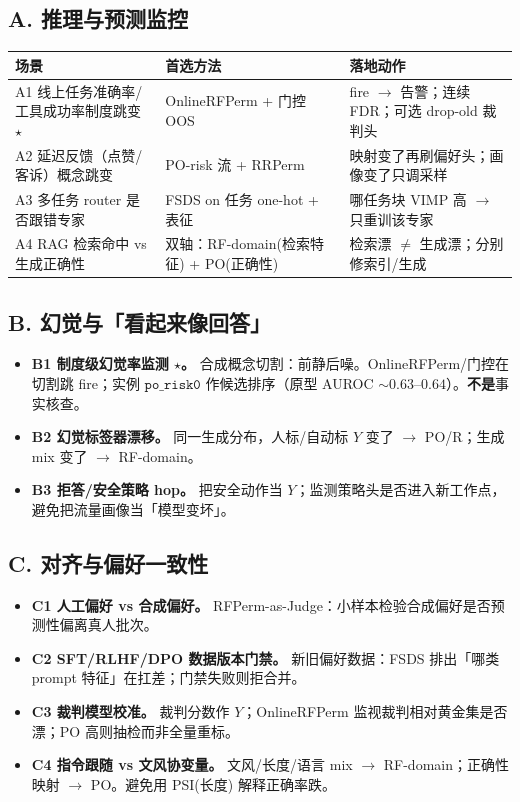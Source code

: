 \documentclass[11pt,a4paper,UTF8,fontset=none]{ctexart}
\begin{document}
\subsection{A. 推理与预测监控}
\begin{longtable}{@{}p{3.2cm}p{3.4cm}p{5.6cm}@{}}
\toprule
场景 & 首选方法 & 落地动作 \\
\midrule
\endhead
A1 线上任务准确率/工具成功率制度跳变 \(\star\) &
OnlineRFPerm + 门控 OOS &
fire \(\to\) 告警；连续 FDR；可选 drop-old 裁判头 \\
A2 延迟反馈（点赞/客诉）概念跳变 &
PO-risk 流 + RRPerm &
映射变了再刷偏好头；画像变了只调采样 \\
A3 多任务 router 是否跟错专家 &
FSDS on 任务 one-hot + 表征 &
哪任务块 VIMP 高 \(\to\) 只重训该专家 \\
A4 RAG 检索命中 vs 生成正确性 &
双轴：RF-domain(检索特征) + PO(正确性) &
检索漂 \(\neq\) 生成漂；分别修索引/生成 \\
\bottomrule
\end{longtable}

\subsection{B. 幻觉与「看起来像回答」}
\begin{itemize}
  \item \textbf{B1 制度级幻觉率监测 \(\star\)。} 合成概念切割：前静后噪。OnlineRFPerm/门控在切割跳 fire；实例 \(\texttt{po\_risk0}\) 作候选排序（原型 AUROC \(\sim 0.63\)--\(0.64\)）。\textbf{不是}事实核查。
  \item \textbf{B2 幻觉标签器漂移。} 同一生成分布，人标/自动标 \(Y\) 变了 \(\to\) PO/R；生成 mix 变了 \(\to\) RF-domain。
  \item \textbf{B3 拒答/安全策略 hop。} 把安全动作当 \(Y\)；监测策略头是否进入新工作点，避免把流量画像当「模型变坏」。
\end{itemize}

\subsection{C. 对齐与偏好一致性}
\begin{itemize}
  \item \textbf{C1 人工偏好 vs 合成偏好。} RFPerm-as-Judge：小样本检验合成偏好是否预测性偏离真人批次。
  \item \textbf{C2 SFT/RLHF/DPO 数据版本门禁。} 新旧偏好数据：FSDS 排出「哪类 prompt 特征」在扛差；门禁失败则拒合并。
  \item \textbf{C3 裁判模型校准。} 裁判分数作 \(Y\)；OnlineRFPerm 监视裁判相对黄金集是否漂；PO 高则抽检而非全量重标。
  \item \textbf{C4 指令跟随 vs 文风协变量。} 文风/长度/语言 mix \(\to\) RF-domain；正确性映射 \(\to\) PO。避免用 PSI(长度) 解释正确率跌。
\end{itemize}
\end{document}
